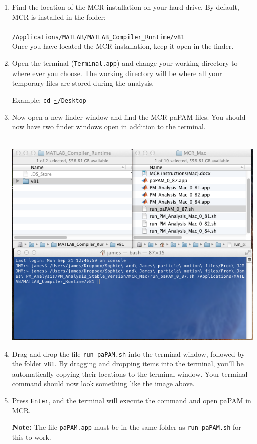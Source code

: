 \documentclass[11pt]{report}
\begin{document}
\begin{enumerate}
\item Find the location of the MCR installation on your hard drive.  By default, MCR is installed in the folder: \\\\
\texttt{/Applications/MATLAB/MATLAB\_Compiler\_Runtime/v81}\\

Once you have located the MCR installation, keep it open in the finder.

\item Open the terminal (\texttt{Terminal.app}) and change your working directory to where ever you choose.  The working directory will be where all your temporary files are stored during the analysis.

Example: \texttt{cd \url{~}/Desktop}

\item Now open a new finder window and find the MCR paPAM files.  You should now have two finder windows open in addition to the terminal.\\\\

\begin{center}
\includegraphics[width = \textwidth]{1.png}
\end{center}

\item Drag and drop the file \texttt{run\_paPAM.sh} into the terminal window, followed by the folder \texttt{v81}.  By dragging and dropping items into the terminal, you'll be automatically copying their locations to the terminal window.  Your terminal command should now look something like the image above.

\item Press \texttt{Enter}, and the terminal will execute the command and open paPAM in MCR.

\textbf{Note:} The file \texttt{paPAM.app} must be in the same folder as \texttt{run\_paPAM.sh} for this to work.
\end{enumerate}
\end{document}
